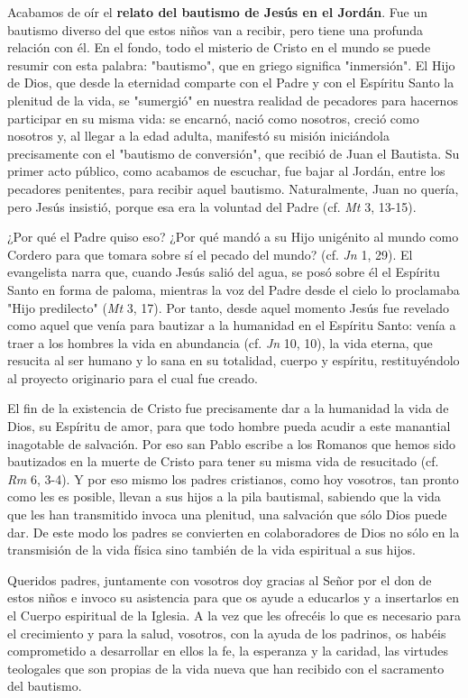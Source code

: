 \documentclass[]{article}
\begin{document}
Acabamos de oír el \textbf{relato del bautismo de Jesús en el Jordán}.
Fue un bautismo diverso del que estos niños van a recibir, pero tiene
una profunda relación con él. En el fondo, todo el misterio de Cristo en
el mundo se puede resumir con esta palabra: "bautismo", que en griego
significa "inmersión". El Hijo de Dios, que desde la eternidad comparte
con el Padre y con el Espíritu Santo la plenitud de la vida, se
"sumergió" en nuestra realidad de pecadores para hacernos participar en
su misma vida: se encarnó, nació como nosotros, creció como nosotros y,
al llegar a la edad adulta, manifestó su misión iniciándola precisamente
con el "bautismo de conversión", que recibió de Juan el Bautista. Su
primer acto público, como acabamos de escuchar, fue bajar al Jordán,
entre los pecadores penitentes, para recibir aquel bautismo.
Naturalmente, Juan no quería, pero Jesús insistió, porque esa era la
voluntad del Padre (cf. \emph{Mt} 3, 13-15).

¿Por qué el Padre quiso eso? ¿Por qué mandó a su Hijo unigénito al mundo
como Cordero para que tomara sobre sí el pecado del mundo? (cf.
\emph{Jn} 1, 29). El evangelista narra que, cuando Jesús salió del agua,
se posó sobre él el Espíritu Santo en forma de paloma, mientras la voz
del Padre desde el cielo lo proclamaba "Hijo predilecto" (\emph{Mt} 3,
17). Por tanto, desde aquel momento Jesús fue revelado como aquel que
venía para bautizar a la humanidad en el Espíritu Santo: venía a traer a
los hombres la vida en abundancia (cf. \emph{Jn} 10, 10), la vida
eterna, que resucita al ser humano y lo sana en su totalidad, cuerpo y
espíritu, restituyéndolo al proyecto originario para el cual fue creado.

El fin de la existencia de Cristo fue precisamente dar a la humanidad la
vida de Dios, su Espíritu de amor, para que todo hombre pueda acudir a
este manantial inagotable de salvación. Por eso san Pablo escribe a los
Romanos que hemos sido bautizados en la muerte de Cristo para tener su
misma vida de resucitado (cf. \emph{Rm} 6, 3-4). Y por eso mismo los
padres cristianos, como hoy vosotros, tan pronto como les es posible,
llevan a sus hijos a la pila bautismal, sabiendo que la vida que les han
transmitido invoca una plenitud, una salvación que sólo Dios puede dar.
De este modo los padres se convierten en colaboradores de Dios no sólo
en la transmisión de la vida física sino también de la vida espiritual a
sus hijos.

Queridos padres, juntamente con vosotros doy gracias al Señor por el don
de estos niños e invoco su asistencia para que os ayude a educarlos y a
insertarlos en el Cuerpo espiritual de la Iglesia. A la vez que les
ofrecéis lo que es necesario para el crecimiento y para la salud,
vosotros, con la ayuda de los padrinos, os habéis comprometido a
desarrollar en ellos la fe, la esperanza y la caridad, las virtudes
teologales que son propias de la vida nueva que han recibido con el
sacramento del bautismo.
\end{document}
